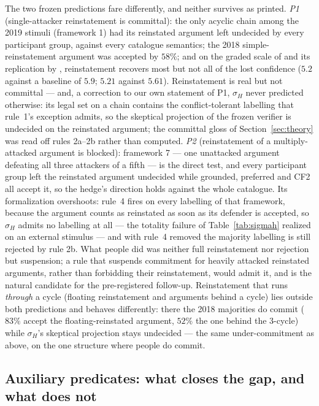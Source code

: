 \documentclass[review,12pt]{elsarticle}
\theoremstyle{definition}
\theoremstyle{remark}
\begin{document}
The two frozen predictions fare differently, and neither survives as
printed. \emph{P1} (single-attacker reinstatement is committal): the only
acyclic chain among the 2019 stimuli (framework 1) had its reinstated argument
left undecided by every participant group, against every catalogue
semantics; the 2018 simple-reinstatement argument was accepted by $58\%$;
and on the graded scale of \citet{rahwan2010} and its replication by
\citet{bezou2025}, reinstatement recovers most but not all of the lost
confidence ($5.2$ against a baseline of $5.9$; $5.21$ against $5.61$).
Reinstatement is real but not committal --- and, a correction to our own
statement of P1, $\sigma_H$ never predicted otherwise: its legal set on a
chain contains the conflict-tolerant labelling that rule~1's exception
admits, so the skeptical projection of the frozen verifier is undecided on
the reinstated argument; the committal gloss of Section~\ref{sec:theory} was
read off rules 2a--2b rather than computed. \emph{P2} (reinstatement of a
multiply-attacked argument is blocked): framework 7 --- one unattacked
argument defeating all three attackers of a fifth --- is the direct test, and
every participant group left the reinstated argument undecided while
grounded, preferred and CF2 all accept it, so the hedge's direction holds
against the whole catalogue. Its formalization overshoots: rule~4 fires on
every labelling of that framework, because the argument counts as reinstated
as soon as its defender is accepted, so $\sigma_H$ admits no labelling at all
--- the totality failure of Table~\ref{tab:sigmah} realized on an external
stimulus --- and with rule~4 removed the majority labelling is still rejected
by rule 2b. What people did was neither full reinstatement nor rejection but
suspension; a rule that suspends commitment for heavily attacked reinstated
arguments, rather than forbidding their reinstatement, would admit it, and is
the natural candidate for the pre-registered follow-up. Reinstatement that
runs \emph{through} a cycle (floating reinstatement and arguments behind a
cycle) lies outside both predictions and behaves differently: there the 2018
majorities do commit ($83\%$ accept the floating-reinstated argument, $52\%$
the one behind the 3-cycle) while $\sigma_H$'s skeptical projection stays
undecided --- the same under-commitment as above, on the one structure where
people do commit.



\subsection{Auxiliary predicates: what closes the gap, and what does not}
\label{sec:aux}
\end{document}
